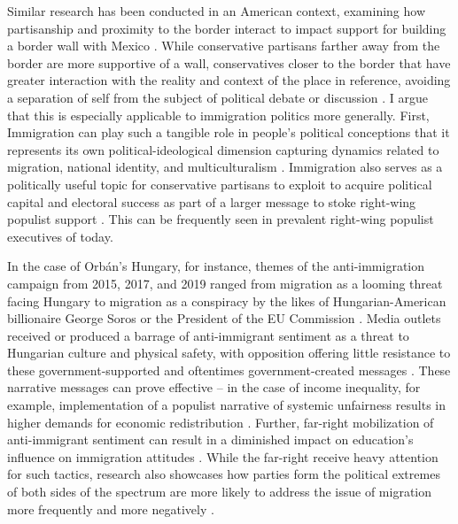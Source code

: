 \documentclass[12pt,]{article}
\begin{document}
Similar research has been conducted in an American context, examining
how partisanship and proximity to the border interact to impact support
for building a border wall with Mexico \citep{cortina2020}. While
conservative partisans farther away from the border are more supportive
of a wall, conservatives closer to the border that have greater
interaction with the reality and context of the place in reference,
avoiding a separation of self from the subject of political debate or
discussion \citep{cortina2020}. I argue that this is especially
applicable to immigration politics more generally. First, Immigration
can play such a tangible role in people's political conceptions that it
represents its own political-ideological dimension capturing dynamics
related to migration, national identity, and multiculturalism
\citep{ogrady2019}. Immigration also serves as a politically useful
topic for conservative partisans to exploit to acquire political capital
and electoral success as part of a larger message to stoke right-wing
populist support \citep{dipiazza2023, kamenova2017}. This can be
frequently seen in prevalent right-wing populist executives of today.

In the case of Orbán's Hungary, for instance, themes of the
anti-immigration campaign from 2015, 2017, and 2019 ranged from
migration as a looming threat facing Hungary to migration as a
conspiracy by the likes of Hungarian-American billionaire George Soros
or the President of the EU Commission \citep{bajomi-lazar2019}. Media
outlets received or produced a barrage of anti-immigrant sentiment as a
threat to Hungarian culture and physical safety, with opposition
offering little resistance to these government-supported and oftentimes
government-created messages \citep{bajomi-lazar2019}. These narrative
messages can prove effective -- in the case of income inequality, for
example, implementation of a populist narrative of systemic unfairness
results in higher demands for economic redistribution
\citep{culpepper2024}. Further, far-right mobilization of anti-immigrant
sentiment can result in a diminished impact on education's influence on
immigration attitudes \citep{mclaren2020}. While the far-right receive
heavy attention for such tactics, research also showcases how parties
form the political extremes of both sides of the spectrum are more
likely to address the issue of migration more frequently and more
negatively \citep{heidenreich2020}.
\end{document}
